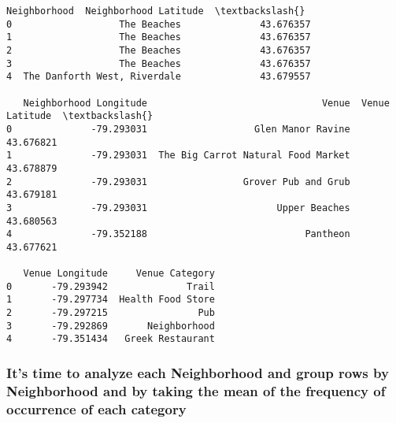 \documentclass[11pt]{article}
\makeatletter
\newcommand{\boxspacing}{\kern\kvtcb@left@rule\kern\kvtcb@boxsep}
\newcommand{\prompt}[4]{
        \ttfamily\llap{{\color{#2}[#3]:\hspace{3pt}#4}}\vspace{-\baselineskip}
    }
\makeatother
\begin{document}
            \begin{tcolorbox}[breakable, size=fbox, boxrule=.5pt, pad at break*=1mm, opacityfill=0]
\prompt{Out}{outcolor}{151}{\boxspacing}
\begin{Verbatim}[commandchars=\\\{\}]
                   Neighborhood  Neighborhood Latitude  \textbackslash{}
0                   The Beaches              43.676357
1                   The Beaches              43.676357
2                   The Beaches              43.676357
3                   The Beaches              43.676357
4  The Danforth West, Riverdale              43.679557

   Neighborhood Longitude                               Venue  Venue Latitude  \textbackslash{}
0              -79.293031                   Glen Manor Ravine       43.676821
1              -79.293031  The Big Carrot Natural Food Market       43.678879
2              -79.293031                 Grover Pub and Grub       43.679181
3              -79.293031                       Upper Beaches       43.680563
4              -79.352188                            Pantheon       43.677621

   Venue Longitude     Venue Category
0       -79.293942              Trail
1       -79.297734  Health Food Store
2       -79.297215                Pub
3       -79.292869       Neighborhood
4       -79.351434   Greek Restaurant
\end{Verbatim}
\end{tcolorbox}
        
    \hypertarget{its-time-to-analyze-each-neighborhood-and-group-rows-by-neighborhood-and-by-taking-the-mean-of-the-frequency-of-occurrence-of-each-category}{%
\subsubsection{It's time to analyze each Neighborhood and group rows by
Neighborhood and by taking the mean of the frequency of occurrence of
each
category}\label{its-time-to-analyze-each-neighborhood-and-group-rows-by-neighborhood-and-by-taking-the-mean-of-the-frequency-of-occurrence-of-each-category}}
\end{document}

